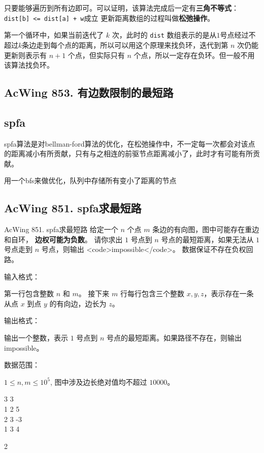 只要能够遍历到所有边即可。可以证明，该算法完成后一定有\textbf{三角不等式}：\lstinline{dist[b] <= dist[a] + w}成立
更新距离数组的过程叫做\textbf{松弛操作}。

第一个循环中，如果当前迭代了 $k$ 次，此时的 \lstinline{dist} 数组表示的是从$1$号点经过不超过$k$条边走到每个点的距离，所以可以用这个原理来找负环，迭代到第 $n$ 次仍能更新则表示有 $n+1$ 个点，但实际只有 $n$ 个点，所以一定存在负环。但一般不用该算法找负环。

\subsection{AcWing 853. 有边数限制的最短路}

\subsection{spfa}
spfa算法是对bellman-ford算法的优化，在松弛操作中，不一定每一次都会对该点的距离减小有所贡献，只有与之相连的前驱节点距离减小了，此时才有可能有所贡献。

用一个bfs来做优化，队列中存储所有变小了距离的节点

\subsection{AcWing 851. spfa求最短路}

\begin{titledbox}{AcWing 851. spfa求最短路}
    给定一个 $n$ 个点 $m$ 条边的有向图，图中可能存在重边和自环， \textbf{边权可能为负数}。 请你求出 $1$ 号点到 $n$ 号点的最短距离，如果无法从 $1$ 号点走到 $n$ 号点，则输出 <code>impossible</code>。
    数据保证不存在负权回路。

    输入格式：

    第一行包含整数 $n$ 和 $m$。 接下来 $m$ 行每行包含三个整数 $x,y,z$，表示存在一条从点 $x$ 到点 $y$ 的有向边，边长为 $z$。

    输出格式：

    输出一个整数，表示 $1$ 号点到 $n$ 号点的最短距离。如果路径不存在，则输出 impossible。

    数据范围：

    $1 \le n,m \le 10^5$, 图中涉及边长绝对值均不超过 $10000$。

    \begin{inputblock}
        3 3 \\
        1 2 5 \\
        2 3 -3 \\
        1 3 4
    \end{inputblock}
    \begin{outputblock}
        2
    \end{outputblock}
\end{titledbox}

